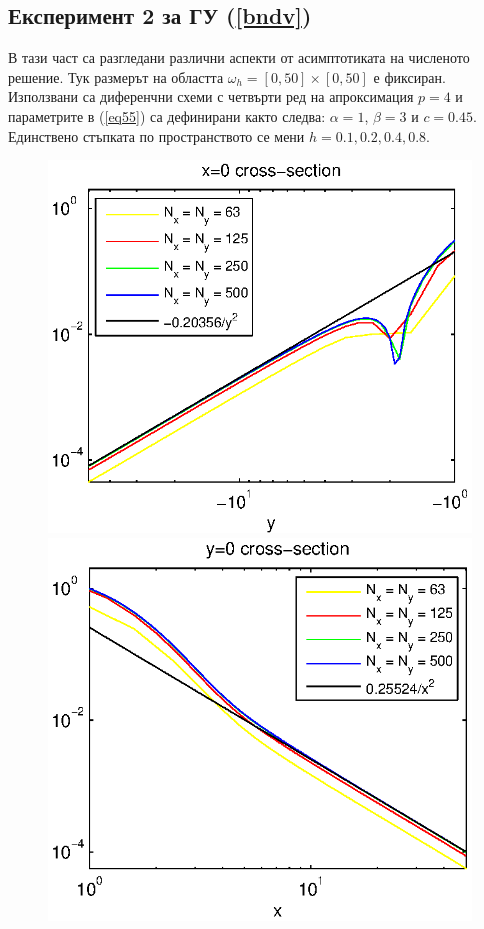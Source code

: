 \documentclass{article}
\newcommand{\rf}[1]{(\ref{#1})}
\begin{document}
\subsection{Експеримент 2 за ГУ \rf{bndv}}
В тази част са разгледани различни аспекти от асимптотиката на численото решение. Тук размерът на областта $\omega_h = [0, 50] \times [0, 50]$ е фиксиран. Използвани са диференчни схеми с четвърти ред на апроксимация $p=4$ и параметрите в \rf{eq55} са дефинирани както следва: $\alpha = 1$, $\beta = 3$ и $c=0.45$. Единствено стъпката по пространството се мени $h=0.1, 0.2, 0.4, 0.8$.
\begin{figure}[ht]
	\begin{minipage}[b]{0.5\linewidth}
		\raggedleft
		\includegraphics[width=\linewidth]{NewBoundaryCondition/crossSectionLogX=0.eps}
	\end{minipage}	
	\begin{minipage}[b]{0.5\linewidth}
		\raggedright
		 \includegraphics[width=\linewidth]{NewBoundaryCondition/crossSectionLogY=0.eps}

\end{minipage}
\end{figure}
\end{document}
